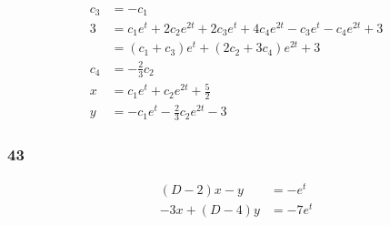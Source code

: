 \documentclass{article}
\begin{document}
\begin{align*}
  c_3                     & = -c_1                                                                            \\
  3                       & = c_1 e^t + 2 c_2 e^{2 t} + 2 c_3 e^t + 4 c_4 e^{2 t} - c_3 e^t - c_4 e^{2 t} + 3 \\
                          & = (c_1 + c_3) e^t + (2 c_2 + 3 c_4) e^{2 t} + 3                                   \\
  c_4                     & = -\frac{2}{3} c_2                                                                \\
  x                       & = c_1 e^t + c_2 e^{2 t} + \frac{5}{2}                                             \\
  y                       & = -c_1 e^t - \frac{2}{3} c_2 e^{2 t} - 3
\end{align*}

\subsubsection{43}

\begin{align*}
  (D - 2) x - y    & = -e^t   \\
  -3 x + (D - 4) y & = -7 e^t
\end{align*}

\end{document}
